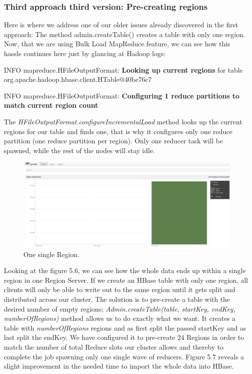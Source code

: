 \subsubsection{Third approach third version: Pre-creating regions}
Here is where we address one of our older issues already discovered in the first approach: The method admin.createTable() creates a table with only one region. Now, that we are using Bulk Load MapReduce feature, we can see how this hassle continues here just by glancing at Hadoop logs:

\bigskip

INFO mapreduce.HFileOutputFormat: \textbf{Looking up current regions} for table org.apache.hadoop.hbase.client.HTable@40be76c7
\par
INFO mapreduce.HFileOutputFormat: \textbf{Configuring 1 reduce partitions to match current region count}

\bigskip

The \textit{HFileOutputFormat.configureIncrementalLoad} method looks up the current regions for our table and finds one, that is why it configures  only one reduce partition (one reduce partition per region). Only one reducer task will be spawned, while the rest of the nodes will stay idle.




\begin{figure}[htb]
\centering
\includegraphics[width=1\textwidth]{./images/1reducer.png}
\caption{One single Region.} \label{fig:oneRegion}
\end{figure}



Looking at the figure 5.6, we can see how the whole data ends up within a single region in one Region Server. If we create an HBase table with only one region, all clients will only be able to write out to the same region until it gets split and distributed across our cluster. The solution is to pre-create a table with the desired number of empty regions; \textit{Admin.createTable(table, startKey, endKey, numberOfRegions)} method allows us to do exactly what we want. It creates a table with \textit{numberOfRegions} regions and as first split the passed startKey and as last split the endKey. We have configured it to pre-create 24 Regions in order to match the number of total Reduce slots our cluster allows and thereby to complete the job spawning only one single wave of reducers. Figure 5.7 reveals a slight improvement in the needed time to import the whole data into HBase.


